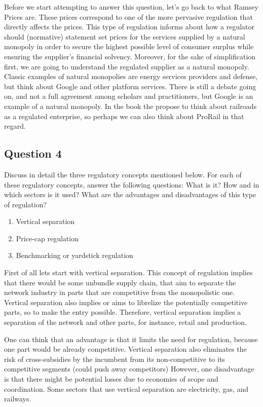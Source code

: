 \documentclass[11pt]{article} %
\begin{document}
Before we start attempting to answer this question, let's go back to what Ramsey Prices are. These prices correspond to one of the more pervasive regulation that directly affects the prices. This type of regulation informs about how a regulator should (normative) statement set prices for the services supplied by a natural monopoly in order to secure the highest possible level of consumer surplus while ensuring the supplier's financial solvency. Moreover, for the sake of simplification first, we are going to understand the regulated supplier as a natural monopoly. Classic examples of natural monopolies are energy services providers and defense, but think about Google and other platform services. There is still a debate going on, and not a full agreement among scholars and practitioners, but Google is an example of a natural monopoly. In the book the propose to think about railroads as a regulated enterprise, so perhaps we can also think about ProRail in that regard.




\subsection{Question 4}
Discuss in detail the three regulatory concepts mentioned below. For each of these regulatory concepts, answer the following questions: What is it? How and in which sectors is it used? What are the advantages and disadvantages of this type of regulation? 
\begin{enumerate}
\item Vertical separation
\item Price-cap regulation
\item Benchmarking or yardstick regulation
\end{enumerate}


First of all lets start with vertical separation. This concept of regulation implies that there would be some unbundle supply chain, that aim to separate the network industry in parts that are competitive from the monopolistic one. Vertical separation also implies or aims to librelize the potentially competitive parts, so to make the entry possible. Therefore, vertical separation implies a separation of the network and other parts, for instance, retail and production.

One can think that an advantage is that it limits the need for regulation, because one part would be already competitive. Vertical separation also eliminates the risk of cross-subsidies by the incumbent from its non-competitive to its competitive segments (could push away competitors)
However, one disadvantage is that there might be potential losses due to economies of scope and coordination. Some sectors that use vertical separation are electricity, gas, and railways.
\end{document}
